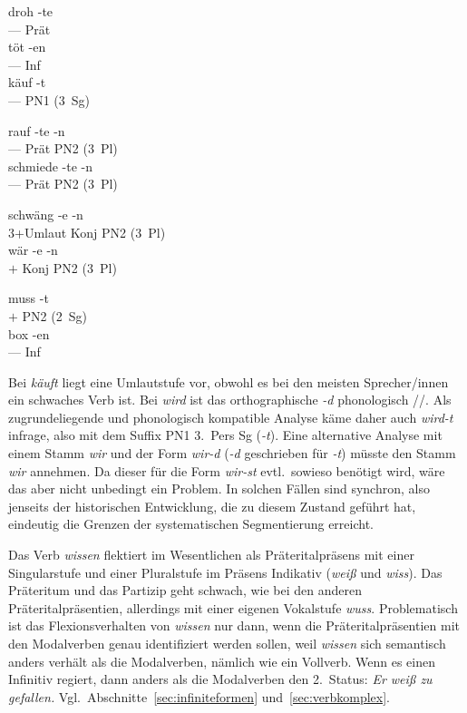 \begin{exe}
\begin{xlist}
    \ex\gll droh -te\\
    --- Prät\\
    \ex\gll töt -en\\
    --- Inf\\
    \ex\gll käuf -t\\
    --- {PN1 (3~Sg)}\\
  \end{xlist}
  \ex
  \begin{xlist}
    \ex\gll rauf -te -n\\
    --- Prät {PN2 (3~Pl)}\\
    \ex\gll schmiede -te -n\\
    --- Prät {PN2 (3~Pl)}\\
  \end{xlist}
  \ex
  \begin{xlist}
    \ex\gll schwäng -e -n\\
    3+Umlaut Konj {PN2 (3~Pl)}\\
    \ex\gll wär -e -n\\
    $+$ Konj {PN2 (3~Pl)}\\
  \end{xlist}
  \ex
  \begin{xlist}
    \ex\gll muss -t\\
    $+$ {PN2 (2~Sg)}\\
    \ex\gll box -en\\
    --- Inf\\
  \end{xlist}
\end{exe}

Bei \textit{käuft} liegt eine Umlautstufe vor, obwohl es bei den meisten Sprecher\slash innen ein schwaches Verb ist.
Bei \textit{wird} ist das orthographische \textit{-d} phonologisch //.
Als zugrundeliegende und phonologisch kompatible Analyse käme daher auch \textit{wird-t} infrage, also mit dem Suffix PN1 3.~Pers Sg (\textit{-t}).
Eine alternative Analyse mit einem Stamm \textit{wir} und der Form \textit{wir-d} (\textit{-d} geschrieben für \textit{-t}) müsste den Stamm \textit{wir} annehmen.
Da dieser für die Form \textit{wir-st} evtl.\ sowieso benötigt wird, wäre das aber nicht unbedingt ein Problem.
In solchen Fällen sind synchron, also jenseits der historischen Entwicklung, die zu diesem Zustand geführt hat, eindeutig die Grenzen der systematischen Segmentierung erreicht.

\label{sol:verbalflexion06}

Das Verb \textit{wissen} flektiert im Wesentlichen als Präteritalpräsens mit einer Singularstufe und einer Pluralstufe im Präsens Indikativ (\textit{weiß} und \textit{wiss}).
Das Präteritum und das Partizip geht schwach, wie bei den anderen Präteritalpräsentien, allerdings mit einer eigenen Vokalstufe \textit{wuss}.
Problematisch ist das Flexionsverhalten von \textit{wissen} nur dann, wenn die Präteritalpräsentien mit den Modalverben genau identifiziert werden sollen, weil \textit{wissen} sich semantisch anders verhält als die Modalverben, nämlich wie ein Vollverb.
Wenn es einen Infinitiv regiert, dann anders als die Modalverben den 2.~Status: \textit{Er weiß zu gefallen.}
Vgl.\ Abschnitte~\ref{sec:infiniteformen} und~\ref{sec:verbkomplex}.

